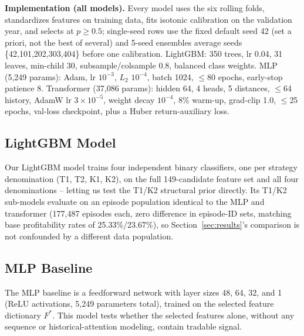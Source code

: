 \documentclass[sigconf,review,anonymous]{acmart}
\begin{document}
\noindent\textbf{Implementation (all models).} Every model uses the six rolling folds, standardizes features on training data, fits isotonic calibration on the validation year, and selects at $p\ge0.5$; single-seed rows use the fixed default seed 42 (set a priori, not the best of several) and 5-seed ensembles average seeds \{42,101,202,303,404\} before one calibration. LightGBM: 350 trees, lr 0.04, 31 leaves, min-child 30, subsample/colsample 0.8, balanced class weights. MLP (5{,}249 params): Adam, lr $10^{-3}$, $L_2$ $10^{-4}$, batch 1024, $\le$80 epochs, early-stop patience 8. Transformer (37{,}086 params): hidden 64, 4 heads, 5 distances, $\le$64 history, AdamW lr $3{\times}10^{-5}$, weight decay $10^{-4}$, 8\% warm-up, grad-clip 1.0, $\le$25 epochs, val-loss checkpoint, plus a Huber return-auxiliary loss.

\subsection{LightGBM Model}
\label{sec:lgbm-scope}
Our LightGBM model trains four independent binary classifiers, one per strategy denomination (T1, T2, K1, K2), on the full 149-candidate feature set and all four denominations -- letting us test the T1/K2 structural prior directly. Its T1/K2 sub-models evaluate on an episode population identical to the MLP and transformer (177{,}487 episodes each, zero difference in episode-ID sets, matching base profitability rates of 25.33\%/23.67\%), so Section~\ref{sec:results}'s comparison is not confounded by a different data population.

\subsection{MLP Baseline}
The MLP baseline is a feedforward network with layer sizes 48, 64, 32, and 1 (ReLU activations, 5{,}249 parameters total), trained on the selected feature dictionary $F^{\ast}$. This model tests whether the selected features alone, without any sequence or historical-attention modeling, contain tradable signal.
\end{document}
